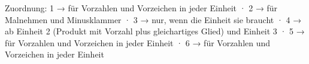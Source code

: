 
Zuordnung: 1 → für Vorzahlen und Vorzeichen in jeder Einheit · 2 → für Malnehmen und Minusklammer · 3 → nur, wenn die Einheit sie braucht · 4 → ab Einheit 2 (Produkt mit Vorzahl plus gleichartiges Glied) und Einheit 3 · 5 → für Vorzahlen und Vorzeichen in jeder Einheit · 6 → für Vorzahlen und Vorzeichen in jeder Einheit

